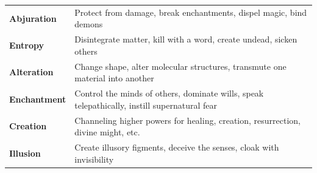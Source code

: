 \documentclass[12pt]{report}
\begin{document}
\begin{longtable}[c]{@{}ll@{}}
\toprule
\begin{minipage}[t]{0.03\columnwidth}\raggedright\strut
\textbf{Abjuration}
\strut\end{minipage} &
\begin{minipage}[t]{0.03\columnwidth}\raggedright\strut
Protect from damage, break enchantments, dispel magic, bind demons
\strut\end{minipage}\tabularnewline
\begin{minipage}[t]{0.03\columnwidth}\raggedright\strut
\textbf{Entropy}
\strut\end{minipage} &
\begin{minipage}[t]{0.03\columnwidth}\raggedright\strut
Disintegrate matter, kill with a word, create undead, sicken others
\strut\end{minipage}\tabularnewline
\begin{minipage}[t]{0.03\columnwidth}\raggedright\strut
\textbf{Alteration}
\strut\end{minipage} &
\begin{minipage}[t]{0.03\columnwidth}\raggedright\strut
Change shape, alter molecular structures, transmute one material into
another
\strut\end{minipage}\tabularnewline
\begin{minipage}[t]{0.03\columnwidth}\raggedright\strut
\textbf{Enchantment}
\strut\end{minipage} &
\begin{minipage}[t]{0.03\columnwidth}\raggedright\strut
Control the minds of others, dominate wills, speak telepathically,
instill supernatural fear
\strut\end{minipage}\tabularnewline
\begin{minipage}[t]{0.03\columnwidth}\raggedright\strut
\textbf{Creation}
\strut\end{minipage} &
\begin{minipage}[t]{0.03\columnwidth}\raggedright\strut
Channeling higher powers for healing, creation, resurrection, divine
might, etc.
\strut\end{minipage}\tabularnewline
\begin{minipage}[t]{0.03\columnwidth}\raggedright\strut
\textbf{Illusion}
\strut\end{minipage} &
\begin{minipage}[t]{0.03\columnwidth}\raggedright\strut
Create illusory figments, deceive the senses, cloak with invisibility
\strut\end{minipage}\tabularnewline

\end{longtable}
\end{document}
